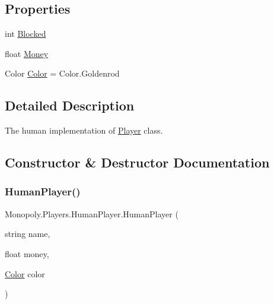 \subsection*{Properties}
\begin{DoxyCompactItemize}
\item 
int \mbox{\hyperlink{class_monopoly_1_1_players_1_1_player_a39ba7c2c1b8f5cdf4c61d3df9653d515}{Blocked}}
\item 
float \mbox{\hyperlink{class_monopoly_1_1_players_1_1_player_aff8ece033d1cf30de1f2afcfc20dff97}{Money}}
\item 
Color \mbox{\hyperlink{class_monopoly_1_1_players_1_1_player_afcfd5b9c28b6ba4ce1e60e2e3baf7e31}{Color}} = Color.\+Goldenrod
\end{DoxyCompactItemize}


\subsection{Detailed Description}
The human implementation of \mbox{\hyperlink{class_monopoly_1_1_players_1_1_player}{Player}} class. 

\subsection{Constructor \& Destructor Documentation}
\mbox{\label{class_monopoly_1_1_players_1_1_human_player_a60418b330c94d88b4a00b79f59b85f53}} 
\subsubsection{\texorpdfstring{Human\+Player()}{HumanPlayer()}}
{\footnotesize\ttfamily Monopoly.\+Players.\+Human\+Player.\+Human\+Player (\begin{DoxyParamCaption}\item[{string}]{name,  }\item[{float}]{money,  }\item[{\mbox{\hyperlink{class_monopoly_1_1_players_1_1_player_afcfd5b9c28b6ba4ce1e60e2e3baf7e31}{Color}}}]{color }\end{DoxyParamCaption})\hspace{0.3cm}{\ttfamily [inline]}}



